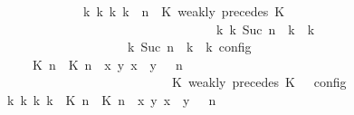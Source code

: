 \begin{isabellebody}
\ \ \ \ \ \ \ \ \ \ \ \ {\isasymLongrightarrow}\ {\isacharparenleft}{\isasymexists}{\isasymGamma}\isactrlsub k\ {\isasymPsi}\isactrlsub k\ {\isasymPhi}\isactrlsub k\ k{\isachardot}\ {\isacharparenleft}{\isacharparenleft}{\isasymGamma}{\isacharcomma}\ n\ {\isasymturnstile}\ {\isacharparenleft}{\isacharparenleft}K\ weakly\ precedes\ K\ {\isacharhash}\ {\isasymPsi}{\isacharparenright}\ {\isasymtriangleright}\ {\isasymPhi}{\isacharparenright}\isanewline
\ \ \ \ \ \ \ \ \ \ \ \ \ \ \ \ \ \ \ \ \ \ \ \ \ \ \ \ \ \ \ \ \ \ {\isasymhookrightarrow}\isactrlbsup k\isactrlesup \ {\isacharparenleft}{\isasymGamma}\isactrlsub k{\isacharcomma}\ Suc\ n\ {\isasymturnstile}\ {\isasymPsi}\isactrlsub k\ {\isasymtriangleright}\ {\isasymPhi}\isactrlsub k{\isacharparenright}{\isacharparenright}\isanewline
\ \ \ \ \ \ \ \ \ \ \ \ \ \ \ \ {\isasymand}\ {\isacharparenleft}{\isasymrho}\ {\isasymin}\ {\isasymlbrakk}\ {\isasymGamma}\isactrlsub k{\isacharcomma}\ Suc\ n\ {\isasymturnstile}\ {\isasymPsi}\isactrlsub k\ {\isasymtriangleright}\ {\isasymPhi}\isactrlsub k\ {\isasymrbrakk}\isactrlsub c\isactrlsub o\isactrlsub n\isactrlsub f\isactrlsub i\isactrlsub g{\isacharparenright}{\isacharparenright}{\isacartoucheclose}\isanewline
\ \ \ \ \ \ \isamarkupfalse%
\ {\isacharminus}\isanewline
\ \ \ \ \ \ \ \ \isamarkupfalse%
\ {\isacartoucheopen}{\isasymrho}\ {\isasymin}\ {\isasymlbrakk}\ {\isacharparenleft}{\isacharparenleft}{\isasymlceil}{\isacharhash}\isactrlsup {\isasymle}\ K\ n{\isacharcomma}\ {\isacharhash}\isactrlsup {\isasymle}\ K\ n{\isasymrceil}\ {\isasymin}\ {\isacharparenleft}{\isasymlambda}{\isacharparenleft}x{\isacharcomma}\ y{\isacharparenright}{\isachardot}\ x\ {\isasymle}\ y{\isacharparenright}{\isacharparenright}\ {\isacharhash}\ {\isasymGamma}{\isacharparenright}{\isacharcomma}\ n\isanewline
\ \ \ \ \ \ \ \ \ \ \ \ \ \ \ \ \ \ \ \ \ \ \ \ {\isasymturnstile}\ {\isasymPsi}\ {\isasymtriangleright}\ {\isacharparenleft}{\isacharparenleft}K\ weakly\ precedes\ K\ {\isacharhash}\ {\isasymPhi}{\isacharparenright}\ {\isasymrbrakk}\isactrlsub c\isactrlsub o\isactrlsub n\isactrlsub f\isactrlsub i\isactrlsub g{\isacartoucheclose}\isanewline
\ \ \ \ \ \ \ \ \isamarkupfalse%
\ {\isacartoucheopen}{\isasymexists}{\isasymGamma}\isactrlsub k\ {\isasymPsi}\isactrlsub k\ {\isasymPhi}\isactrlsub k\ k{\isachardot}\ {\isacharparenleft}{\isacharparenleft}{\isacharparenleft}{\isacharparenleft}{\isasymlceil}{\isacharhash}\isactrlsup {\isasymle}\ K\ n{\isacharcomma}\ {\isacharhash}\isactrlsup {\isasymle}\ K\ n{\isasymrceil}\ {\isasymin}\ {\isacharparenleft}{\isasymlambda}{\isacharparenleft}x{\isacharcomma}\ y{\isacharparenright}{\isachardot}\ x\ {\isasymle}\ y{\isacharparenright}{\isacharparenright}\ {\isacharhash}\ {\isasymGamma}{\isacharparenright}{\isacharcomma}\ n\isanewline

\end{isabellebody}
